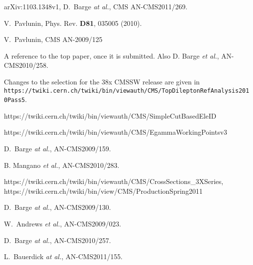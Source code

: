\begin{thebibliography}{10}

 arXiv:1103.1348v1, D.~Barge {\em at al.}, CMS AN-CMS2011/269.

 V.~Pavlunin, Phys. Rev. {\bf D81}, 035005 (2010).
    
 V.~Pavlunin, CMS AN-2009/125

 A reference to the top paper, once it is submitted.  Also
D. Barge {\em et al.}, AN-CMS2010/258.  

 Changes to the selection for the 38x CMSSW release are given in 
{\tt https://twiki.cern.ch/twiki/bin/viewauth/CMS/TopDileptonRefAnalysis2010Pass5}.

 https://twiki.cern.ch/twiki/bin/viewauth/CMS/SimpleCutBasedEleID

 https://twiki.cern.ch/twiki/bin/viewauth/CMS/EgammaWorkingPointsv3

 D.~Barge {\em at al.}, AN-CMS2009/159.

 B. Mangano {\em et al.}, %
AN-CMS2010/283.

 https://twiki.cern.ch/twiki/bin/viewauth/CMS/CrossSections\_3XSeries, 
https://twiki.cern.ch/twiki/bin/view/CMS/ProductionSpring2011


 D.~Barge {\em at al.}, AN-CMS2009/130.

 W.~Andrews {\em et al.}, AN-CMS2009/023.

 D.~Barge {\em at al.}, AN-CMS2010/257.

 L.~Bauerdick {\em at al.}, AN-CMS2011/155.

\end{thebibliography}
